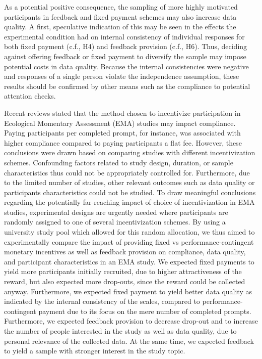 \documentclass[authordate, empirical]{jote-new-article}
\begin{document}
	As a potential positive consequence, the sampling of more highly motivated participants in feedback and fixed payment schemes may also increase data quality. A first, speculative indication of this may be seen in the effects the experimental condition had on internal consistency of individual responses for both fixed payment (c.f., H4) and feedback provision (c.f., H6). Thus, deciding against offering feedback or fixed payment to diversify the sample may impose potential costs in data quality. Because the internal consistencies were negative and responses of a single person violate the independence assumption, these results should be confirmed by other means such as the compliance to potential attention checks.

	\begin{originalPurpose}




		Recent reviews stated that the method chosen to incentivize participation in Ecological Momentary Assessment (EMA) studies may impact compliance. Paying participants per completed prompt, for instance, was associated with higher compliance compared to paying participants a flat fee. However, these conclusions were drawn based on comparing studies with different incentivization schemes. Confounding factors related to study design, duration, or sample characteristics thus could not be appropriately controlled for. Furthermore, due to the limited number of studies, other relevant outcomes such as data quality or participants characteristics could not be studied. To draw meaningful conclusions regarding the potentially far-reaching impact of choice of incentivization in EMA studies, experimental designs are urgently needed where participants are randomly assigned to one of several incentivization schemes. By using a university study pool which allowed for this random allocation, we thus aimed to experimentally compare the impact of providing fixed vs performance-contingent monetary incentives as well as feedback provision on compliance, data quality, and participant characteristics in an EMA study. We expected fixed payments to yield more participants initially recruited, due to higher attractiveness of the reward, but also expected more drop-outs, since the reward could be collected anyway. Furthermore, we expected fixed payment to yield better data quality as indicated by the internal consistency of the scales, compared to performance-contingent payment due to its focus on the mere number of completed prompts. Furthermore, we expected feedback provision to decrease drop-out and to increase the number of people interested in the study as well as data quality, due to personal relevance of the collected data. At the same time, we expected feedback to yield a sample with stronger interest in the study topic.
	\end{originalPurpose}
\end{document}
